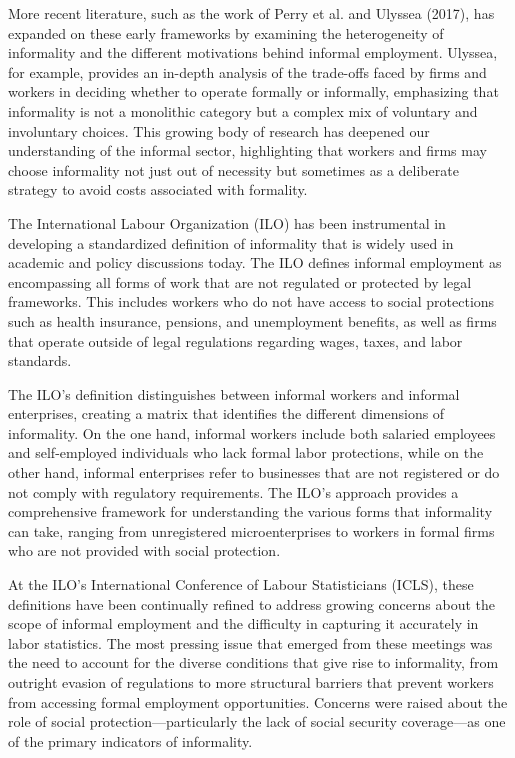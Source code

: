 \documentclass[english]{article}
\begin{document}
More recent literature, such as the work of Perry et al. and Ulyssea (2017), has expanded on these early frameworks by examining the heterogeneity of informality and the different motivations behind informal employment. Ulyssea, for example, provides an in-depth analysis of the trade-offs faced by firms and workers in deciding whether to operate formally or informally, emphasizing that informality is not a monolithic category but a complex mix of voluntary and involuntary choices. This growing body of research has deepened our understanding of the informal sector, highlighting that workers and firms may choose informality not just out of necessity but sometimes as a deliberate strategy to avoid costs associated with formality.

The International Labour Organization (ILO) has been instrumental in developing a standardized definition of informality that is widely used in academic and policy discussions today. The ILO defines informal employment as encompassing all forms of work that are not regulated or protected by legal frameworks. This includes workers who do not have access to social protections such as health insurance, pensions, and unemployment benefits, as well as firms that operate outside of legal regulations regarding wages, taxes, and labor standards.

The ILO’s definition distinguishes between informal workers and informal enterprises, creating a matrix that identifies the different dimensions of informality. On the one hand, informal workers include both salaried employees and self-employed individuals who lack formal labor protections, while on the other hand, informal enterprises refer to businesses that are not registered or do not comply with regulatory requirements. The ILO’s approach provides a comprehensive framework for understanding the various forms that informality can take, ranging from unregistered microenterprises to workers in formal firms who are not provided with social protection.

At the ILO’s International Conference of Labour Statisticians (ICLS), these definitions have been continually refined to address growing concerns about the scope of informal employment and the difficulty in capturing it accurately in labor statistics. The most pressing issue that emerged from these meetings was the need to account for the diverse conditions that give rise to informality, from outright evasion of regulations to more structural barriers that prevent workers from accessing formal employment opportunities. Concerns were raised about the role of social protection—particularly the lack of social security coverage—as one of the primary indicators of informality.
\end{document}
